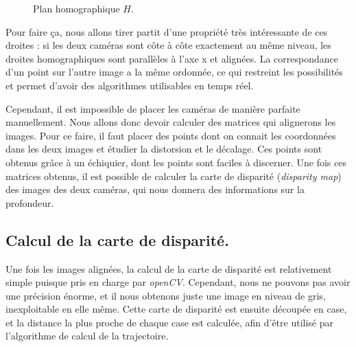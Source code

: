 \begin{figure}
    \begin{center}
    \end{center}
    \caption{Plan homographique $H$.}
    \label{homo}
\end{figure}

Pour faire ça, nous allons tirer partit d'une propriété très intéressante de ces droites : si les deux caméras sont côte à côte exactement au même niveau, les droites homographiques sont parallèles à l'axe x et alignées. La correspondance d'un point sur l'autre image a la même ordonnée, ce qui restreint les possibilités et permet d'avoir des algorithmes utilisables en temps réel.

Cependant, il est impossible de placer les caméras de manière parfaite manuellement. Nous allons donc devoir calculer des matrices qui alignerons les images. Pour ce faire, il faut placer des points dont on connait les coordonnées dans les deux images et étudier la distorsion et le décalage. Ces points sont obtenus grâce à un échiquier, dont les points sont faciles à discerner. Une fois ces matrices obtenus, il est possible de calculer la carte de disparité (\emph{disparity map}) des images des deux caméras, qui nous donnera des informations sur la profondeur.

\subsection{Calcul de la carte de disparité.}
Une fois les images alignées, la calcul de la carte de disparité est relativement simple puisque pris en charge par \emph{openCV}. Cependant, nous ne pouvons pas avoir une précision énorme, et il nous obtenons juste une image en niveau de gris, inexploitable en elle même. Cette carte de disparité est ensuite découpée en case, et la distance la plus proche de chaque case est calculée, afin d'être utilisé par l'algorithme de calcul de la trajectoire.

